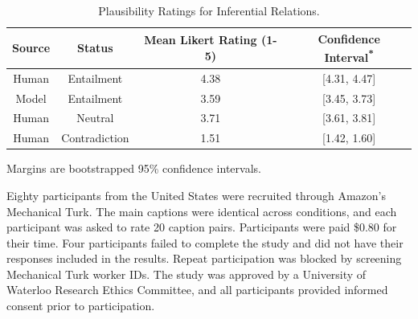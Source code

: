 \documentclass[utf8]{frontiersSCNS} %
\begin{document}
\begin{table}[!t]
\begin{center} 
\begin{threeparttable}

\setlength{\tabcolsep}{16pt}

\caption{Plausibility Ratings for Inferential Relations.} 
\label{ratings} 
\vskip 0.12in
\begin{tabular}{c c c c} 
\hline
Source & Status &  Mean Likert Rating (1-5) & Confidence Interval\textsuperscript{*}\\
\hline
\rule{0pt}{3ex}Human & Entailment  &  4.38  & [4.31, 4.47] \\
Model & Entailment  &  3.59 & [3.45, 3.73] \\
Human & Neutral &  3.71  & [3.61, 3.81] \\
Human & Contradiction & 1.51 & [1.42, 1.60] \\

\hline
\end{tabular}
\begin{tablenotes}
      \vskip 0.06in
      \footnotesize
      \item\centering * Margins are bootstrapped 95\% confidence intervals.
\end{tablenotes}

\end{threeparttable}
\end{center} 
\end{table}

Eighty participants from the United States were recruited through Amazon's Mechanical Turk.  The main captions were identical across conditions, and each participant was asked to rate 20 caption pairs. Participants were paid \$0.80 for their time. Four participants failed to complete the study and did not have their responses included in the results. Repeat participation was blocked by screening Mechanical Turk worker IDs. The study was approved by a University of Waterloo Research Ethics Committee, and all participants provided informed consent prior to participation. 
\end{document}
